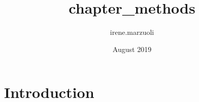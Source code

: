 \documentclass{article}
\title{chapter_methods}
\author{irene.marzuoli }
\date{August 2019}
\begin{document}
\maketitle

\section{Introduction}
\end{document}
